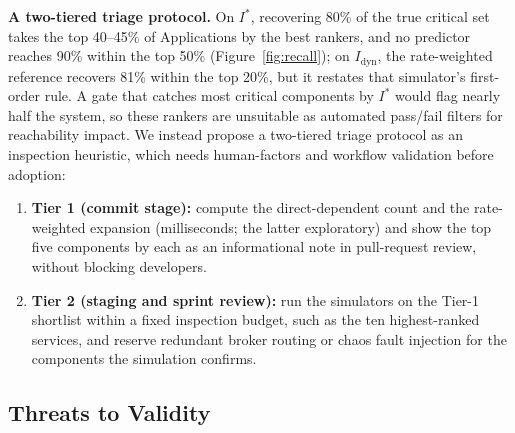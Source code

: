 \documentclass[preprint,3p]{elsarticle}
\providecommand{\tightlist}{%
  \setlength{\itemsep}{0pt}\setlength{\parskip}{0pt}}
\begin{document}
\noindent\textbf{A two-tiered triage protocol.} On $I^*$, recovering 80\% of the true critical set takes the top 40--45\% of Applications by the best rankers, and no predictor reaches 90\% within the top 50\% (Figure~\ref{fig:recall}); on $I_{\text{dyn}}$, the rate-weighted reference recovers 81\% within the top 20\%, but it restates that simulator's first-order rule. A gate that catches most critical components by $I^*$ would flag nearly half the system, so these rankers are unsuitable as automated pass/fail filters for reachability impact. We instead propose a two-tiered triage protocol as an inspection heuristic, which needs human-factors and workflow validation before adoption:
\begin{enumerate}\tightlist
    \item \textbf{Tier 1 (commit stage):} compute the direct-dependent count and the rate-weighted expansion (milliseconds; the latter exploratory) and show the top five components by each as an informational note in pull-request review, without blocking developers.
    \item \textbf{Tier 2 (staging and sprint review):} run the simulators on the Tier-1 shortlist within a fixed inspection budget, such as the ten highest-ranked services, and reserve redundant broker routing or chaos fault injection for the components the simulation confirms.
\end{enumerate}

\subsection{Threats to Validity}
\label{sec:8.3}
\label{sec:threats}
\end{document}
